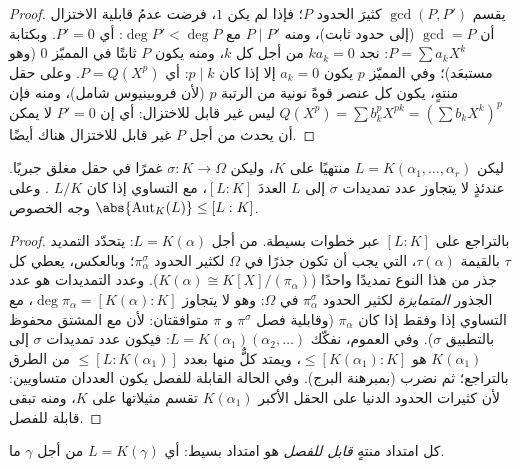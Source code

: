 \begin{proof}
يقسم $\gcd(P, P')$ كثيرَ الحدود $P$؛ فإذا لم يكن $1$، فرضت عدمُ
قابلية الاختزال أن $\gcd = P$ (إلى حدود ثابت)، ومنه $P \mid P'$
مع $\deg
P' < \deg P$: أي $P' = 0$. وبكتابة $P = \sum a_kX^k$: نجد $ka_k = 0$ من أجل
كل $k$، ومنه يكون $P$ ثابتًا في المميّز $0$ (وهو مستبعَد)؛ وفي
المميّز $p$ يكون $a_k = 0$ إلا إذا كان $p \mid k$: أي $P =
Q(X^p)$.
وعلى حقل منتهٍ، يكون كل عنصر قوةً نونية من الرتبة $p$ (لأن
فروبينيوس شامل)، ومنه فإن $Q(X^p) = \sum b_k^p X^{pk} = (\sum
b_kX^k)^p$ ليس غير قابل للاختزال: أي إن
$P' = 0$ لا يمكن أن يحدث من أجل $P$ غير قابل للاختزال هناك
أيضًا.
\end{proof}

\begin{proposition}\label{prop:b3:galois:embeddings}
ليكن $L = K(\alpha_1, \dots, \alpha_r)$ منتهيًا على $K$، وليكن $\sigma \colon K \to \Omega$ غمرًا في حقل مغلق
جبريًا. عندئذٍ لا يتجاوز عدد تمديدات $\sigma$ إلى $L$ العددَ
$[L:K]$، مع التساوي إذا كان $L/K$ . وعلى وجه الخصوص
$\abs{\operatorname{Aut}_K(L)} \leq [L:K]$.
\end{proposition}

\begin{proof}
بالتراجع على $[L:K]$ عبر خطوات بسيطة. من أجل $L = K(\alpha)$:
يتحدّد التمديد $\tau$ بالقيمة $\tau(\alpha)$، التي يجب أن تكون
جذرًا في $\Omega$ لكثير الحدود $\pi_\alpha^\sigma$؛ وبالعكس، يعطي كل جذر من
هذا النوع تمديدًا واحدًا ($K(\alpha) \cong K[X]/(\pi_\alpha)$). وعدد التمديدات هو عدد الجذور
\emph{المتمايزة} لكثير الحدود $\pi_\alpha^\sigma$ في $\Omega$: وهو لا يتجاوز
$\deg\pi_\alpha =
[K(\alpha):K]$، مع التساوي إذا وفقط إذا كان $\pi_\alpha$ 
(وقابلية فصل $\pi^\sigma$ و $\pi$ متوافقتان: لأن  مع المشتق محفوظ بالتطبيق $\sigma$). وفي العموم، نفكّك $L =
K(\alpha_1)(\alpha_2, \dots)$:
فيكون عدد تمديدات $\sigma$ إلى $K(\alpha_1)$ هو $\leq [K(\alpha_1):K]$، ويمتد
كلٌّ منها بعدد $\leq [L : K(\alpha_1)]$ من الطرق بالتراجع؛ ثم نضرب (بمبرهنة البرج). وفي
الحالة القابلة للفصل يكون العددان متساويين: لأن كثيرات الحدود
الدنيا على الحقل الأكبر $K(\alpha_1)$ تقسم مثيلاتها على $K$،
ومنه تبقى قابلة للفصل.
\end{proof}

\begin{theorem}\label{thm:b3:galois:primitive}
كل امتداد منتهٍ \emph{قابل للفصل} هو امتداد بسيط: أي $L =
K(\gamma)$ من
أجل $\gamma$ ما.
\end{theorem}

